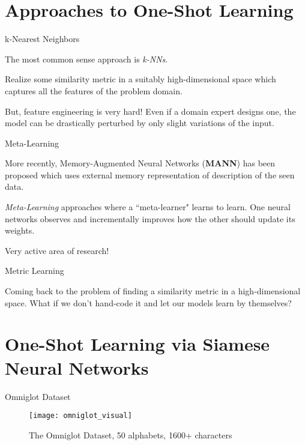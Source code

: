 \documentclass{beamer}
\begin{document}
\section{Approaches to One-Shot Learning}

\begin{frame}{k-Nearest Neighbors}

The most common sense approach is \textit{k-NNs}.

Realize some similarity metric in a suitably high-dimensional space which captures
all the features of the problem domain.

But, feature engineering is very hard! Even if a domain expert designs one, the model
can be drastically perturbed by only slight variations of the input.

\end{frame}

\begin{frame}{Meta-Learning}

More recently, Memory-Augmented Neural Networks (\textbf{MANN}) has been
proposed which uses external memory representation of description of the seen
data.

\textit{Meta-Learning} approaches where a ``meta-learner" learns to learn. One
neural networks observes and incrementally improves how the other should update
its weights.

Very active area of research!

\end{frame}

\begin{frame}{Metric Learning}

Coming back to the problem of finding a similarity metric in a high-dimensional
space. What if we don't hand-code it and let our models learn by themselves?

\end{frame}

\section{One-Shot Learning via Siamese Neural Networks}

\begin{frame}{Omniglot Dataset}

\begin{figure}[H]
\caption{The Omniglot Dataset, 50 alphabets, 1600+ characters  \cite{Lake_oneshot}}
\texttt{[image: omniglot\_visual]}
\centering
\label{img:omniglot_visual}
\end{figure}

\end{frame}
\end{document}

